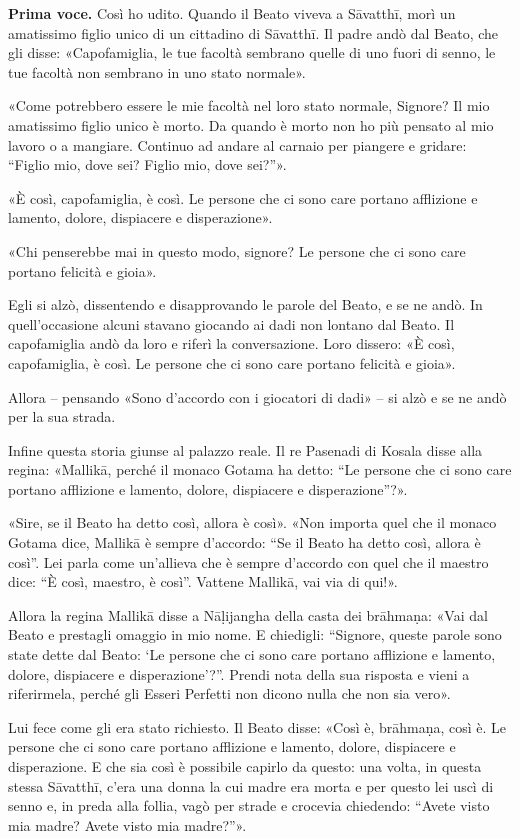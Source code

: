 \textbf{Prima voce.} Così ho udito. Quando il Beato viveva a Sāvatthī, morì un
amatissimo figlio unico di un cittadino di Sāvatthī. Il padre andò dal
Beato, che gli disse: «Capofamiglia, le tue facoltà sembrano quelle di
uno fuori di senno, le tue facoltà non sembrano in uno stato normale».


«Come potrebbero essere le mie facoltà nel loro stato normale, Signore?
Il mio amatissimo figlio unico è morto. Da quando è morto non ho più
pensato al mio lavoro o a mangiare. Continuo ad andare al carnaio per
piangere e gridare: “Figlio mio, dove sei? Figlio mio, dove sei?”».


«È così, capofamiglia, è così. Le persone che ci sono care portano
afflizione e lamento, dolore, dispiacere e disperazione».


«Chi penserebbe mai in questo modo, signore? Le persone che ci sono care
portano felicità e gioia».


Egli si alzò, dissentendo e disapprovando le parole del Beato, e se ne
andò. In quell’occasione alcuni stavano giocando ai dadi non lontano dal
Beato. Il capofamiglia andò da loro e riferì la conversazione. Loro
dissero: «È così, capofamiglia, è così. Le persone che ci sono care
portano felicità e gioia».


Allora – pensando «Sono d’accordo con i giocatori di dadi» – si alzò e
se ne andò per la sua strada.


Infine questa storia giunse al palazzo reale. Il re Pasenadi di Kosala
disse alla regina: «Mallikā, perché il monaco Gotama ha detto: “Le
persone che ci sono care portano afflizione e lamento, dolore,
dispiacere e disperazione”?».


«Sire, se il Beato ha detto così, allora è così». «Non importa quel che
il monaco Gotama dice, Mallikā è sempre d’accordo: “Se il Beato ha detto
così, allora è così”. Lei parla come un’allieva che è sempre d’accordo
con quel che il maestro dice: “È così, maestro, è così”. Vattene
Mallikā, vai via di qui!».


Allora la regina Mallikā disse a Nāḷijangha della casta dei brāhmaṇa:
«Vai dal Beato e prestagli omaggio in mio nome. E chiedigli: “Signore,
queste parole sono state dette dal Beato: ‘Le persone che ci sono care
portano afflizione e lamento, dolore, dispiacere e disperazione’?”.
Prendi nota della sua risposta e vieni a riferirmela, perché gli Esseri
Perfetti non dicono nulla che non sia vero».


Lui fece come gli era stato richiesto. Il Beato disse: «Così è,
brāhmaṇa, così è. Le persone che ci sono care portano afflizione e
lamento, dolore, dispiacere e disperazione. E che sia così è possibile
capirlo da questo: una volta, in questa stessa Sāvatthī, c’era una donna
la cui madre era morta e per questo lei uscì di senno e, in preda alla
follia, vagò per strade e crocevia chiedendo: “Avete visto mia madre?
Avete visto mia madre?”».


